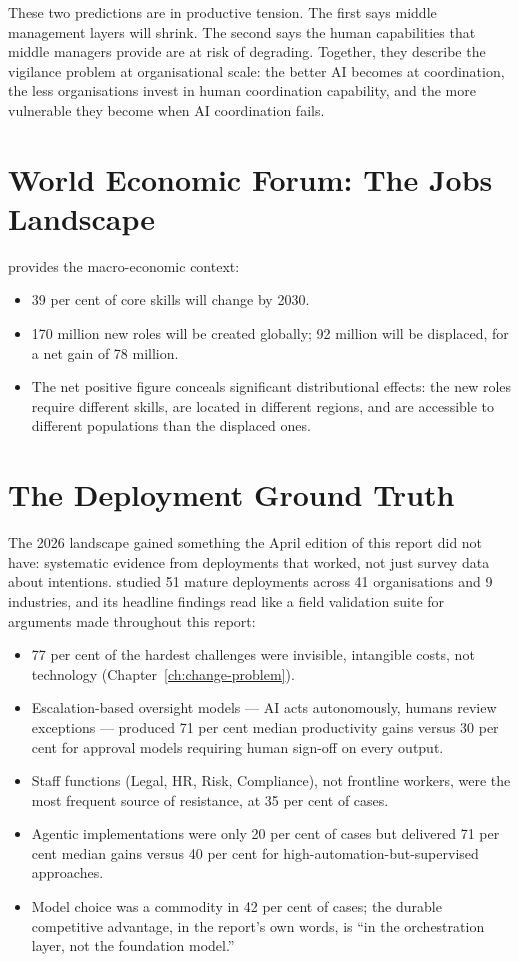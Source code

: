 These two predictions are in productive tension. The first says middle management layers will shrink. The second says the human capabilities that middle managers provide are at risk of degrading. Together, they describe the vigilance problem at organisational scale: the better AI becomes at coordination, the less organisations invest in human coordination capability, and the more vulnerable they become when AI coordination fails.

\section{World Economic Forum: The Jobs Landscape}

\textcite{WEF2025} provides the macro-economic context:

\begin{itemize}
  \item 39 per cent of core skills will change by 2030.
  \item 170 million new roles will be created globally; 92 million will be displaced, for a net gain of 78 million.
  \item The net positive figure conceals significant distributional effects: the new roles require different skills, are located in different regions, and are accessible to different populations than the displaced ones.
\end{itemize}

\section{The Deployment Ground Truth}

The 2026 landscape gained something the April edition of this report did not have: systematic evidence from deployments that worked, not just survey data about intentions. \textcite{Pereira2026Playbook} studied 51 mature deployments across 41 organisations and 9 industries, and its headline findings read like a field validation suite for arguments made throughout this report:

\begin{itemize}
  \item 77 per cent of the hardest challenges were invisible, intangible costs, not technology (Chapter~\ref{ch:change-problem}).
  \item Escalation-based oversight models --- AI acts autonomously, humans review exceptions --- produced 71 per cent median productivity gains versus 30 per cent for approval models requiring human sign-off on every output.
  \item Staff functions (Legal, HR, Risk, Compliance), not frontline workers, were the most frequent source of resistance, at 35 per cent of cases.
  \item Agentic implementations were only 20 per cent of cases but delivered 71 per cent median gains versus 40 per cent for high-automation-but-supervised approaches.
  \item Model choice was a commodity in 42 per cent of cases; the durable competitive advantage, in the report's own words, is ``in the orchestration layer, not the foundation model.''
\end{itemize}

